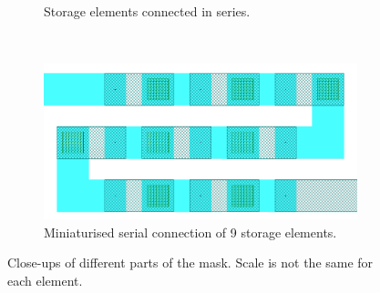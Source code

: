 \begin{figure}
\begin{subfigure}[b]{0.35\paperwidth}
        \caption{Storage elements connected in series.}
        \label{FabricationMaskDetb}
    \end{subfigure}
    \\
    \begin{subfigure}[b]{0.5\paperwidth}
    	\centering
        \includegraphics[width=0.3\paperwidth]{img/04/mask_series_9_zoom.png}
        \caption{Miniaturised serial connection of 9 storage elements.}
        \label{FabricationMaskDetc}
    \end{subfigure}
    \caption{Close-ups of different parts of the mask. Scale is not the same for each element.}
    \label{FabricationMaskDet}
\end{figure}

